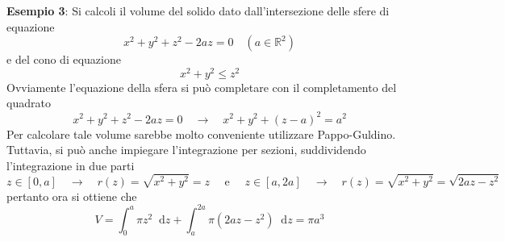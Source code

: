 \documentclass[a4paper]{extarticle}
\newcommand*\dif{\mathop{}\!\mathrm{d}}
\begin{document}
\vspace{2em}
\noindent
\textbf{Esempio 3}: Si calcoli il volume del solido dato dall'intersezione delle sfere di equazione
\[x^2+y^2+z^2 - 2az = 0 \hspace{1em} (a \in \mathbb{R}^2)\]
e del cono di equazione
\[x^2+y^2 \leq z^2\]
Ovviamente l'equazione della sfera si può completare con il completamento del quadrato
\[x^2+y^2+z^2 - 2az = 0 \hspace{1em} \rightarrow \hspace{1em} x^2+y^2+(z-a)^2=a^2\]
Per calcolare tale volume sarebbe molto conveniente utilizzare Pappo-Guldino. Tuttavia, si può anche impiegare l'integrazione per sezioni, suddividendo l'integrazione in due parti
\[z \in [0,a] \hspace{1em} \rightarrow \hspace{1em} r(z)=\sqrt{x^2+y^2}=z \hspace{1em} \text{ e } \hspace{1em} z \in [a,2a] \hspace{1em} \rightarrow \hspace{1em} r(z)=\sqrt{x^2+y^2} = \sqrt{2az-z^2}\]
pertanto ora si ottiene che
\[V=\int_0^a \pi z^2 \dif z + \int_a^{2a} \pi (2az - z^2) \dif z = \pi a^3\]
\end{document}
